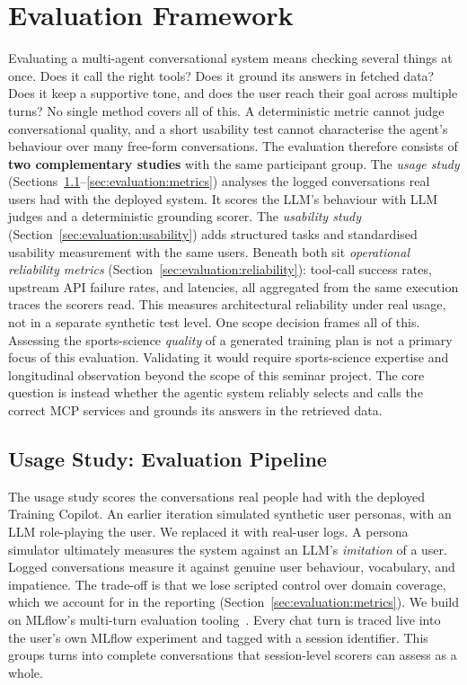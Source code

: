 \section{Evaluation Framework}\label{sec:evaluation}

Evaluating a multi-agent conversational system means checking several things at once. Does it call the right tools? Does it ground its answers in fetched data? Does it keep a supportive tone, and does the user reach their goal across multiple turns? No single method covers all of this. A deterministic metric cannot judge conversational quality, and a short usability test cannot characterise the agent's behaviour over many free-form conversations. The evaluation therefore consists of \textbf{two complementary studies} with the same participant group. The \textit{usage study} (Sections~\ref{sec:evaluation:framework}--\ref{sec:evaluation:metrics}) analyses the logged conversations real users had with the deployed system. It scores the LLM's behaviour with LLM judges and a deterministic grounding scorer. The \textit{usability study} (Section~\ref{sec:evaluation:usability}) adds structured tasks and standardised usability measurement with the same users. Beneath both sit \textit{operational reliability metrics} (Section~\ref{sec:evaluation:reliability}): tool-call success rates, upstream API failure rates, and latencies, all aggregated from the same execution traces the scorers read. This measures architectural reliability under real usage, not in a separate synthetic test level. One scope decision frames all of this. Assessing the sports-science \textit{quality} of a generated training plan is not a primary focus of this evaluation. Validating it would require sports-science expertise and longitudinal observation beyond the scope of this seminar project. The core question is instead whether the agentic system reliably selects and calls the correct MCP services and grounds its answers in the retrieved data.

\subsection{Usage Study: Evaluation Pipeline}\label{sec:evaluation:framework}

The usage study scores the conversations real people had with the deployed Training Copilot. An earlier iteration simulated synthetic user personas, with an LLM role-playing the user. We replaced it with real-user logs. A persona simulator ultimately measures the system against an LLM's \textit{imitation} of a user. Logged conversations measure it against genuine user behaviour, vocabulary, and impatience. The trade-off is that we lose scripted control over domain coverage, which we account for in the reporting (Section~\ref{sec:evaluation:metrics}). We build on MLflow's multi-turn evaluation tooling~\citep{mlflow_multiturn_2025}. Every chat turn is traced live into the user's own MLflow experiment and tagged with a session identifier. This groups turns into complete conversations that session-level scorers can assess as a whole.

